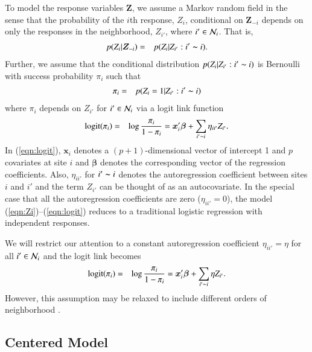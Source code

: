 \documentclass[authoryear,review, 12pt]{elsarticle}
\begin{document}
To model the response variables $\bm{Z}$, we assume a Markov random field in the sense that the probability of the $i$th response, $Z_i$, conditional on $\bm{Z}_{-i}$ depends on only the responses in the neighborhood, $Z_{i'}$, where $i'\in{\cal N}_i$.  That is,
\begin{eqnarray}
p(Z_i|\bm{Z}_{-i}) &=& p(Z_i|Z_{i'}: i'\thicksim i).
\label{eqn:Zi}
\end{eqnarray}
Further, we assume that the conditional distribution $p(Z_i|Z_{i'}: i'\thicksim i)$ is Bernoulli with success probability $\pi_i$ such that
\begin{eqnarray}
\pi_i &=& p(Z_i=1|Z_{i'}: i'\thicksim i)
\label{eqn:pii}
\end{eqnarray}
where $\pi_i$ depends on $Z_{i'}$ for $i'\in{\cal N}_i$ via a logit link function
\begin{eqnarray}
\mbox{logit}(\pi_i) &=& \log\frac{\pi_i}{1-\pi_i}=\bm{x}'_i\bm{\beta}+\sum_{i'\thicksim i}\eta_{ii'}Z_{i'}.
\label{eqn:logit}
\end{eqnarray}
In (\ref{eqn:logit}),  $\bm{x}_i$ denotes a $(p+1)$-dimensional vector of intercept 1 and $p$ covariates at site $i$ and $\bm{\beta}$ denotes the corresponding vector of the regression coefficients.  Also, $\eta_{ii'}$ for $i'\thicksim i$ denotes the autoregression coefficient between sites $i$ and $i'$ and the term $Z_{i'}$ can be thought of as an autocovariate.  In the special case that all the autoregression coefficients are zero ($\eta_{ii'}=0$), the model (\ref{eqn:Zi})--(\ref{eqn:logit}) reduces to a traditional logistic regression with independent responses.  

We will restrict our attention to a constant autoregression coefficient $\eta_{ii'}=\eta$ for all $i'\in{\cal N}_i$ and the logit link becomes
\begin{eqnarray}
\mbox{logit}(\pi_i) &=& \log\frac{\pi_i}{1-\pi_i}=\bm{x}'_i\bm{\beta}+\sum_{i'\thicksim i}\eta Z_{i'}.
\label{eqn:logitConst}
\end{eqnarray}
However, this assumption may be relaxed to include different orders of neighborhood \citep{zhuh10}.  

\subsection{Centered Model}
\label{subsec:model:regCenter}
\end{document}
